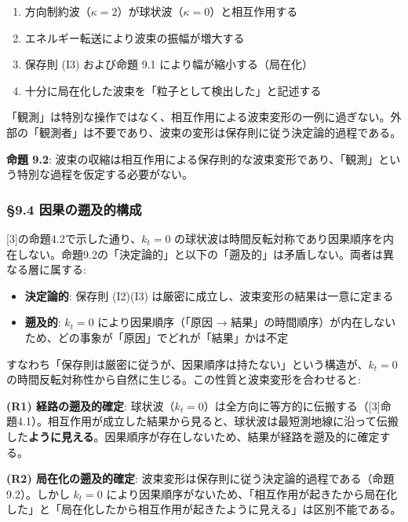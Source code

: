 \documentclass[
  a4paper,11pt]{ltjsarticle}
\providecommand{\tightlist}{%
  \setlength{\itemsep}{0pt}\setlength{\parskip}{0pt}}
\theoremstyle{definition}
\theoremstyle{remark}
\begin{document}
\begin{enumerate}
\def\labelenumi{\arabic{enumi}.}
\tightlist
\item
  方向制約波（\(\kappa = 2\)）が球状波（\(\kappa = 0\)）と相互作用する
\item
  エネルギー転送により波束の振幅が増大する
\item
  保存則 (I3) および命題 9.1 により幅が縮小する（局在化）
\item
  十分に局在化した波束を「粒子として検出した」と記述する
\end{enumerate}

「観測」は特別な操作ではなく、相互作用による波束変形の一例に過ぎない。外部の「観測者」は不要であり、波束の変形は保存則に従う決定論的過程である。

\textbf{命題 9.2}:
波束の収縮は相互作用による保存則的な波束変形であり、「観測」という特別な過程を仮定する必要がない。

\subsubsection{§9.4
因果の遡及的構成}\label{ux56e0ux679cux306eux9061ux53caux7684ux69cbux6210}

{[}3{]}の命題4.2で示した通り、\(k_t = 0\)
の球状波は時間反転対称であり因果順序を内在しない。命題9.2の「決定論的」と以下の「遡及的」は矛盾しない。両者は異なる層に属する:

\begin{itemize}
\tightlist
\item
  \textbf{決定論的}: 保存則 (I2)(I3)
  は厳密に成立し、波束変形の結果は一意に定まる
\item
  \textbf{遡及的}: \(k_t = 0\) により因果順序（「原因 →
  結果」の時間順序）が内在しないため、どの事象が「原因」でどれが「結果」かは不定
\end{itemize}

すなわち「保存則は厳密に従うが、因果順序は持たない」という構造が、\(k_t = 0\)
の時間反転対称性から自然に生じる。この性質と波束変形を合わせると:

\textbf{(R1) 経路の遡及的確定}:
球状波（\(k_t = 0\)）は全方向に等方的に伝搬する（{[}3{]}命題4.1）。相互作用が成立した結果から見ると、球状波は最短測地線に沿って伝搬した\textbf{ように見える}。因果順序が存在しないため、結果が経路を遡及的に確定する。

\textbf{(R2) 局在化の遡及的確定}:
波束変形は保存則に従う決定論的過程である（命題9.2）。しかし \(k_t = 0\)
により因果順序がないため、「相互作用が起きたから局在化した」と「局在化したから相互作用が起きたように見える」は区別不能である。
\end{document}
